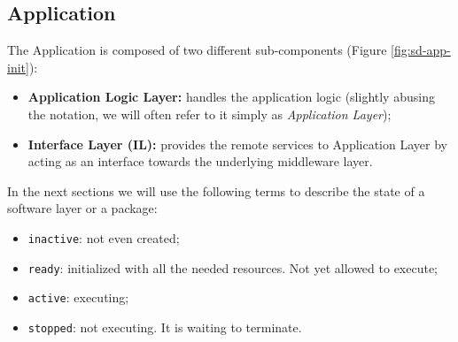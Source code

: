 \subsection{Application}
The Application is composed of two different sub-components (Figure
\ref{fig:sd-app-init}):

\begin{itemize}
  \item \textbf{Application Logic Layer:} handles the application logic
    (slightly abusing the notation, we will often refer to it simply as
    \textit{Application Layer});
  \item \textbf{Interface Layer (IL):} provides the remote services to Application
    Layer by acting as an interface towards the underlying middleware layer.
\end{itemize}

In the next sections we will use the following terms to describe the state of a
software layer or a package:
\begin{itemize}
	\item \verb|inactive|: not even created;
	\item \verb|ready|: initialized with all the needed resources. Not yet
	allowed to execute;
	\item \verb|active|: executing;
	\item \verb|stopped|: not executing. It is waiting to terminate.
\end{itemize}







% 